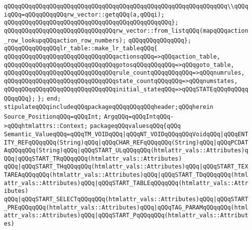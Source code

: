 \newline
\verb|qQQqqQQqqQQqqQQqqQQqqQQqqQQqqQQqqQQqqQQqqQQqqQQqqQQqqQQqqQQqqQQq\\qQQqiqQQq=qQQqqQQqqQQqrw_vector::getqQQq(a,qQQqi);|\newline
\verb|qQQqqQQqqQQqqQQqqQQqqQQqqQQqqQQqqQQqqQQqqQQqqQQq};|\newline
\newline
\verb|qQQqqQQqqQQqqQQqqQQqqQQqqQQqqQQqrw_vector::from_listqQQq(mapqQQqaction_row_lookupqQQqaction_row_numbers);|\newline
\verb|qQQqqQQqqQQqqQQq};|\newline
\newline
\verb|qQQqqQQqqQQqqQQqlr_table::make_lr_tableqQQq{|\newline
\verb|qQQqqQQqqQQqqQQqqQQqqQQqqQQqqQQqactionsqQQq=>qQQqaction_table,|\newline
\verb|qQQqqQQqqQQqqQQqqQQqqQQqqQQqqQQqgotosqQQqqQQqqQQq=>qQQqgoto_table,|\newline
\verb|qQQqqQQqqQQqqQQqqQQqqQQqqQQqqQQqrule_countqQQqqQQqqQQq=>qQQqnumrules,|\newline
\verb|qQQqqQQqqQQqqQQqqQQqqQQqqQQqqQQqstate_countqQQqqQQq=>qQQqnumstates,|\newline
\verb|qQQqqQQqqQQqqQQqqQQqqQQqqQQqqQQqinitial_stateqQQq=>qQQqSTATEqQQq0qQQqqQQqqQQq};|\newline
\verb|};|\newline
\verb|end;|\newline
\verb|stipulateqQQqincludeqQQqpackageqQQqqQQqqQQqheader;qQQqherein|\newline
\verb|Source_PositionqQQq=qQQqInt;|\newline
\verb|ArgqQQq=qQQqIntqQQq->qQQqhtmlattrs::Context;|\newline
\verb|packageqQQqvaluesqQQq{qQQq|\newline
\verb|Semantic_ValueqQQq=qQQqTM_VOIDqQQq|\verb#|qQQqNT_VOIDqQQqqQQqVoidqQQq|qQQqENTITY_REFqQQqqQQq(String)qQQq|qQQqCHAR_REFqQQqqQQq(String)qQQq|qQQqPCDATAqQQqqQQq(String)qQQq|qQQqSTART_ULqQQqqQQq(htmlattr_vals::Attributes)qQQq|qQQqSTART_TRqQQqqQQq(htmlattr_vals::Attributes)#\newline
\verb|qQQq|\verb#|qQQqSTART_THqQQqqQQq(htmlattr_vals::Attributes)qQQq|qQQqSTART_TEXTAREAqQQqqQQq(htmlattr_vals::Attributes)qQQq|qQQqSTART_TDqQQqqQQq(htmlattr_vals::Attributes)qQQq|qQQqSTART_TABLEqQQqqQQq(htmlattr_vals::Attributes)#\newline
\verb|qQQq|\verb#|qQQqSTART_SELECTqQQqqQQq(htmlattr_vals::Attributes)qQQq|qQQqSTART_PREqQQqqQQq(htmlattr_vals::Attributes)qQQq|qQQqTAG_PARAMqQQqqQQq(htmlattr_vals::Attributes)qQQq|qQQqSTART_PqQQqqQQq(htmlattr_vals::Attributes)#\newline
